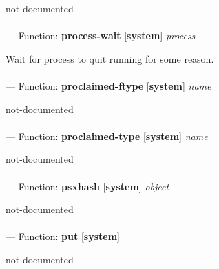 \begin{adjustwidth}{5em}{5em}
not-documented
\end{adjustwidth}

\paragraph{}
\label{SYSTEM:PROCESS-WAIT}
--- Function: \textbf{process-wait} [\textbf{system}] \textit{process}

\begin{adjustwidth}{5em}{5em}
Wait for process to quit running for some reason.
\end{adjustwidth}

\paragraph{}
\label{SYSTEM:PROCLAIMED-FTYPE}
--- Function: \textbf{proclaimed-ftype} [\textbf{system}] \textit{name}

\begin{adjustwidth}{5em}{5em}
not-documented
\end{adjustwidth}

\paragraph{}
\label{SYSTEM:PROCLAIMED-TYPE}
--- Function: \textbf{proclaimed-type} [\textbf{system}] \textit{name}

\begin{adjustwidth}{5em}{5em}
not-documented
\end{adjustwidth}

\paragraph{}
\label{SYSTEM:PSXHASH}
--- Function: \textbf{psxhash} [\textbf{system}] \textit{object}

\begin{adjustwidth}{5em}{5em}
not-documented
\end{adjustwidth}

\paragraph{}
\label{SYSTEM:PUT}
--- Function: \textbf{put} [\textbf{system}] \textit{}

\begin{adjustwidth}{5em}{5em}
not-documented
\end{adjustwidth}

